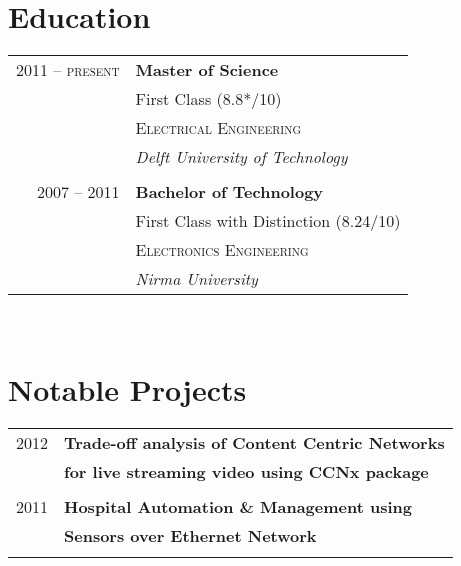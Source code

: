 \documentclass[10pt]{article} %
\begin{document}
{\begin{minipage}[t]{0.44\textwidth}
\section{Education} 

\begin{tabular}{rl} %


2011 -- \textsc{present} & \textbf{Master of Science} \\ 
& \small First Class (8.8*/10)\\
& \textsc{Electrical Engineering} \\ 
& \textit{Delft University of Technology}\\
&\\
	 

2007 -- 2011 & \textbf{Bachelor of Technology} \\ 
& \small First Class with Distinction (8.24/10)\\
& \textsc{Electronics Engineering} \\ 
& \textit{Nirma University}\\

\end{tabular}\\[10pt]

\section{Notable Projects} 
\begin{tabular}{rl}

2012	 & \textbf{Trade-off analysis of Content Centric Networks}\\
& \textbf{for live streaming video using CCNx package}\\ \\


2011	 & \textbf{Hospital Automation \& Management using}\\
& \textbf{Sensors over Ethernet Network}\\ 
\\


\end{tabular}
\end{minipage}}
\end{document}
